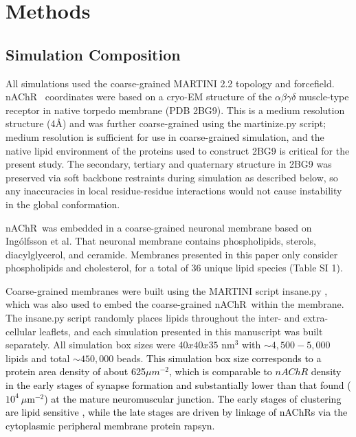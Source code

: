 \documentclass[%
 aip,
 amsmath,amssymb,
 preprint,%
]{revtex4-1}\usepackage{setspace}
\newcommand{\grace}[1]{\textcolor{black}{{#1}}}
\newcommand{\nachr}{nAChR}
\begin{document}
\section{Methods}
\label{lab}

\subsection{Simulation Composition}
All simulations used the coarse-grained MARTINI 2.2\cite{DeJong2012} topology and forcefield.
\nachr~ coordinates were based on a cryo-EM structure of the $\alpha{\beta}\gamma\delta$ muscle-type receptor in native torpedo membrane (PDB 2BG9\cite{Unwin2005}). This is a medium resolution structure (4\AA) and was further coarse-grained using the martinize.py script; medium resolution is sufficient for use in coarse-grained simulation, and the native lipid environment of the proteins used to construct 2BG9 is critical for the present study. The secondary, tertiary and quaternary structure in 2BG9 was preserved via soft backbone restraints during simulation as described below, so any inaccuracies in local residue-residue interactions would not cause instability in the global conformation.  

\nachr~was embedded in a coarse-grained neuronal membrane based on Ing{\'o}lfsson et al\cite{Ingolfsson2017b}. That neuronal membrane contains phospholipids, sterols, diacylglycerol, and ceramide. Membranes presented in this paper only consider phospholipids and cholesterol, for a total of 36 unique lipid species (Table SI 1).

Coarse-grained membranes were built using the MARTINI script insane.py \cite{Wassenaar2015}, which was also used to embed the coarse-grained \nachr~within the membrane. The insane.py script randomly places lipids throughout the inter- and extra-cellular leaflets, and each simulation presented in this manuscript was built separately. All simulation box sizes were $40x40x35$ nm$^3$ with  $\sim 4,500-5,000$ lipids and total $\sim450,000$ beads. \grace{This simulation box size corresponds to a protein area density of about 625$\mu m^{-2}$, which is comparable\cite{Fox2009} to $\nachr{}$ density in the early stages of synapse formation and substantially lower than that found ($10^4~\mu$m$^{-2}$)\cite{Ramarao1998} at the mature neuromuscular junction. The early stages of clustering are lipid sensitive \cite{Barrantes2010a,Bruses2001, Marchand2002}, while the late stages are driven by linkage of nAChRs via the cytoplasmic peripheral membrane protein rapsyn.\cite{Zuber2013}}
\end{document}
